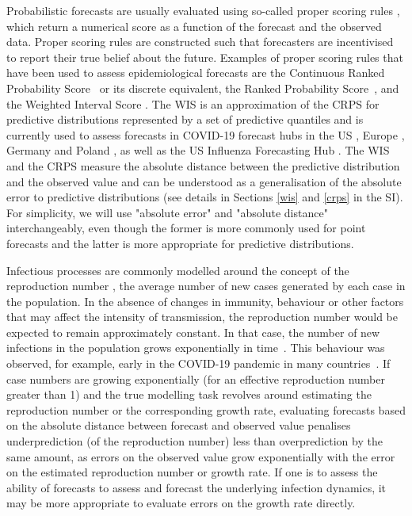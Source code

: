 \documentclass{article}
\begin{document}
Probabilistic forecasts are usually evaluated using so-called proper scoring rules \citep{gneitingStrictlyProperScoring2007}, which return a numerical score as a function of the forecast and the observed data. Proper scoring rules are constructed such that forecasters are incentivised to report their true belief about the future. Examples of proper scoring rules that have been used to assess epidemiological forecasts are the Continuous Ranked Probability Score~\citep[CRPS,][]{gneitingStrictlyProperScoring2007} or its discrete equivalent, the Ranked Probability Score~\citep[RPS,][]{funk19_assessingperformancereal}, and the Weighted Interval Score \citep[WIS,][formulas given in Section \ref{wis} in the SI]{bracherEvaluatingEpidemicForecasts2021}. The WIS is an approximation of the CRPS for predictive distributions represented by a set of predictive quantiles and is currently used to assess forecasts in COVID-19 forecast hubs in the US \citep{cramerCOVID19ForecastHub2020, cramerEvaluationIndividualEnsemble2021}, Europe \citep{sherrattPredictivePerformanceMultimodel2022}, Germany and Poland \citep{bracherShorttermForecastingCOVID192021, bracherNationalSubnationalShortterm2021}, as well as the US Influenza Forecasting Hub \citep{CdcepiFlusightforecastdata2022}. The WIS and the CRPS measure the absolute distance between the predictive distribution and the observed value and can be understood as a generalisation of the absolute error to predictive distributions (see details in Sections \ref{wis} and \ref{crps} in the SI). For simplicity, we will use "absolute error" and "absolute distance" interchangeably, even though the former is more commonly used for point forecasts and the latter is more appropriate for predictive distributions. 

Infectious processes are commonly modelled around the concept of the reproduction number \citep{gosticPracticalConsiderationsMeasuring2020}, the average number of new cases generated by each case in the population.
In the absence of changes in immunity, behaviour or other factors that may affect the intensity of transmission, the reproduction number would be expected to remain approximately constant.
In that case, the number of new infections in the population grows exponentially in time~\citep{dushoff2021_speedstrengthepidemic}.
This behaviour was observed, for example, early in the COVID-19 pandemic in many countries~\citep{pellis21_challengescontrolcovid}.
If case numbers are growing exponentially (for an effective reproduction number greater than 1) and the true modelling task revolves around estimating the reproduction number or the corresponding growth rate, evaluating forecasts based on the absolute distance between forecast and observed value penalises underprediction (of the reproduction number) less than overprediction by the same amount, as errors on the observed value grow exponentially with the error on the estimated reproduction number or growth rate.
If one is to assess the ability of forecasts to assess and forecast the underlying infection dynamics, it may be more appropriate to evaluate errors on the growth rate directly.
\end{document}
